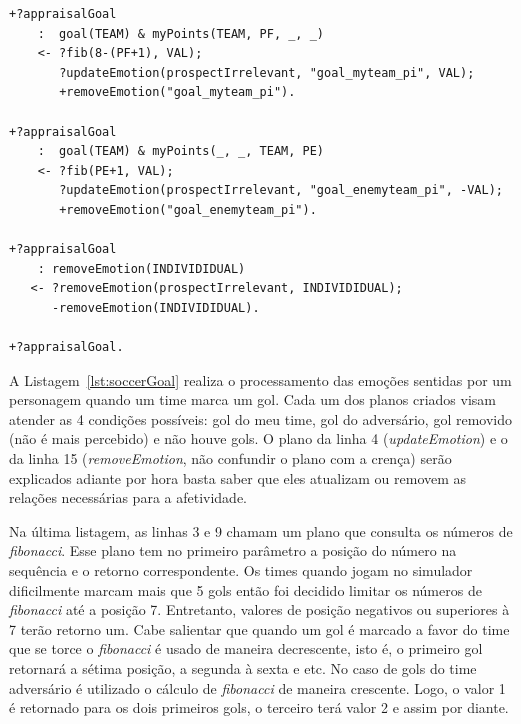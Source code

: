 \begin{center}
    \begin{minipage}{120mm}
	\lstset{linewidth=120mm}
	\begin{lstlisting}[frame=trbl,
caption=Parte do código do agente referente à avaliação de gol,
label=lst:soccerGoal]
+?appraisalGoal
    :  goal(TEAM) & myPoints(TEAM, PF, _, _)
    <- ?fib(8-(PF+1), VAL);
       ?updateEmotion(prospectIrrelevant, "goal_myteam_pi", VAL);
       +removeEmotion("goal_myteam_pi").

+?appraisalGoal
    :  goal(TEAM) & myPoints(_, _, TEAM, PE)
    <- ?fib(PE+1, VAL);
       ?updateEmotion(prospectIrrelevant, "goal_enemyteam_pi", -VAL);
       +removeEmotion("goal_enemyteam_pi").

+?appraisalGoal
    : removeEmotion(INDIVIDIDUAL)
   <- ?removeEmotion(prospectIrrelevant, INDIVIDIDUAL);
      -removeEmotion(INDIVIDIDUAL).

+?appraisalGoal.
	\end{lstlisting}
    \end{minipage}
\end{center}

A Listagem~\ref{lst:soccerGoal} realiza o processamento das emoções sentidas
por um personagem quando um time marca um gol. Cada um dos planos criados
visam atender as 4 condições possíveis: gol do meu time, gol do adversário,
gol removido (não é mais percebido) e não houve gols. O plano da
linha 4 (\emph{updateEmotion}) e o da linha 15 (\emph{removeEmotion}, não
confundir o plano com a crença) serão explicados adiante por hora basta saber
que eles atualizam ou removem as relações necessárias para a afetividade.

Na última listagem, as linhas 3 e 9 chamam um plano que consulta os números de
\emph{fibonacci}. Esse plano tem no primeiro parâmetro a posição do número na
sequência e o retorno correspondente.
Os times quando jogam no simulador dificilmente
marcam mais que 5 gols então foi decidido limitar os números de
\emph{fibonacci} até a posição 7. Entretanto, valores de posição negativos ou
superiores à 7 terão retorno um. Cabe salientar que quando um gol é marcado
a favor do time que se torce o \emph{fibonacci} é usado de maneira
decrescente, isto é, o primeiro gol retornará a sétima posição, a segunda à
sexta e etc. No caso de gols do time adversário é utilizado o cálculo de
\emph{fibonacci} de maneira crescente. Logo, o valor 1 é retornado para os
dois primeiros gols, o terceiro terá valor 2 e assim por diante.


